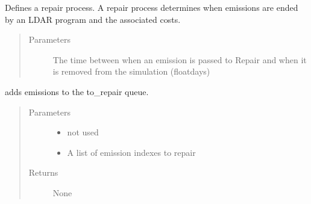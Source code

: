 \documentclass[letterpaper,10pt,english]{sphinxmanual}
\begin{document}
\begin{fulllineitems}
\label{\detokenize{index:feast.DetectionModules.repair.Repair}}
Defines a repair process. A repair process determines when emissions are ended by an LDAR program and the
associated costs.
\begin{quote}\begin{description}
\item[{Parameters}] \leavevmode
{} \textendash{} The time between when an emission is passed to Repair and when it is removed from the
simulation (float\textendash{}days)

\end{description}\end{quote}

\begin{fulllineitems}
\label{\detokenize{index:feast.DetectionModules.repair.Repair.action}}
adds emissions to the to\_repair queue.
\begin{quote}\begin{description}
\item[{Parameters}] \leavevmode\begin{itemize}
\item {} 
 \textendash{} not used

\item {} 
 \textendash{} A list of emission indexes to repair

\end{itemize}

\item[{Returns}] \leavevmode
None

\end{description}\end{quote}

\end{fulllineitems}



\end{fulllineitems}
\end{document}
